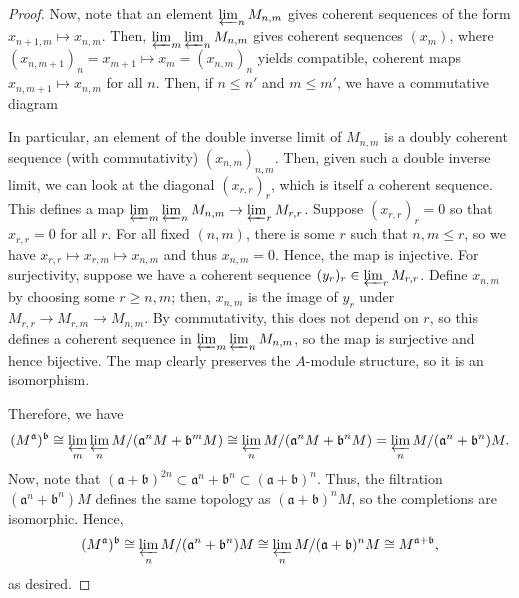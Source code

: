 \begin{proof}
Now, note that an element $\varprojlim_n M_{n,m}$ gives coherent sequences of the form $x_{n+1,m} \mapsto x_{n,m}$. Then, $\varprojlim_m \varprojlim_n M_{n,m}$
gives coherent sequences $(x_m)$, where $(x_{n,m+1})_n = x_{m+1} \mapsto x_m = (x_{n,m})_n$ yields compatible, coherent maps $x_{n,m+1} \mapsto x_{n,m}$ for all
$n$. Then, if $n \le n'$ and $m \le m'$, we have a commutative diagram
\begin{center}
\end{center}
In particular, an element of the double inverse limit of $M_{n,m}$ is a doubly coherent sequence (with commutativity) $(x_{n,m})_{n,m}$. Then, given such a double inverse
limit, we can look at the diagonal $(x_{r,r})_r$, which is itself a coherent sequence. This defines a map $\varprojlim_m \varprojlim_n M_{n,m} \to \varprojlim_r M_{r,r}$.
Suppose $(x_{r,r})_r = 0$ so that $x_{r,r} = 0$ for all $r$. For all fixed $(n,m)$, there is some $r$ such that $n,m \le r$, so we have $x_{r,r} \mapsto x_{r,m} \mapsto x_{n,m}$
and thus $x_{n,m} = 0$. Hence, the map is injective. For surjectivity, suppose we have a coherent sequence $(y_r)_r \in \varprojlim_r M_{r,r}$. Define $x_{n,m}$ by
choosing some $r \ge n,m$; then, $x_{n,m}$ is the image of $y_r$ under $M_{r,r} \to M_{r,m} \to M_{n,m}$. By commutativity, this does not depend on $r$, so this defines
a coherent sequence in $\varprojlim_m \varprojlim_n M_{n,m}$, so the map is surjective and hence bijective. The map clearly preserves the $A$-module structure, so it is 
an isomorphism.

Therefore, we have
$$(M^{\mathfrak{a}})^{\mathfrak{b}} \cong \varprojlim_m \varprojlim_n M/(\mathfrak{a}^n M + \mathfrak{b}^m M) 
\cong \varprojlim_n M/(\mathfrak{a}^n M + \mathfrak{b}^n M) = \varprojlim_n M/(\mathfrak{a}^n + \mathfrak{b}^n) M.$$
Now, note that $(\mathfrak{a} + \mathfrak{b})^{2n} \subset \mathfrak{a}^n + \mathfrak{b}^n \subset (\mathfrak{a} + \mathfrak{b})^n$. Thus, the filtration 
$(\mathfrak{a}^n + \mathfrak{b}^n) M$ defines the same topology as $(\mathfrak{a} + \mathfrak{b})^n M$, so the completions are isomorphic. Hence,
$$(M^{\mathfrak{a}})^{\mathfrak{b}} \cong \varprojlim_n M/(\mathfrak{a}^n + \mathfrak{b}^n) M 
\cong \varprojlim_n M/(\mathfrak{a} + \mathfrak{b})^n M \cong M^{\mathfrak{a} + \mathfrak{b}},$$
as desired.
\end{proof}

